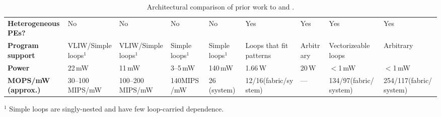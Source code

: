 {\begin{table*}[htb]
{\begin{tabular}{l|p{0.7in}p{0.7in}p{0.7in}|p{0.7in}p{0.7in}p{0.7in}|p{0.7in}p{0.7in}}
    \bf Heterogeneous PEs?  & No                                             & No                 & No                 & No                                      & Yes                                & Yes                                  & Yes               & Yes                  \\[.5ex]
    \bf Program support & VLIW/Simple loops$^1$            & VLIW/Simple loops$^1$      &  Simple loops$^1$                             & Simple loops$^1$                & Loops that fit patterns                     & Arbitrary & Vectorizeable loops & Arbitrary                    \\[.5ex]
    \midrule
    \bf Power               & 22\,mW                                         & 11\,mW             & 3--5\,mW           & 140\,mW                              & 1.66\,W                            & 20\,W                                & $<$1\,mW               & $<$1\,mW           \\[.5ex]
    \bf MOPS/mW (approx.)   & 30--100 \linebreak MIPS/mW                                        & 100--200 MIPS/mW           & 140\linebreak MIPS/mW              & 26 (system)                                 & 12/16\linebreak(fabric/system)                                & ---                                  & 134/97\linebreak (fabric/system)      & 254/117\linebreak(fabric/system)                  \\[.5ex]
    \bottomrule
  \end{tabular}

  }
	
	$^1$ Simple loops are singly-nested and have few loop-carried dependence.

  \caption{Architectural comparison of prior work to \snafu and \riptide.}
  \label{tab:motivation}
\end{table*}
}

\newcommand{\figFutureModel}{
  \begin{figure}[htb]
    \centering
    \texttt{[image: figures/pdf/future\_model\_legend-crop.pdf]} 

    \vspace{0.5em}

    \texttt{[image: figures/pdf/future\_model-crop.pdf]} 
    \caption{Device lifetime as a function of problem size. A \riptide-based system smartly discarding uninteresting data achieves similar lifetime to a hypothetical system with a 10TOPS/W processor. \riptide (Summary), which only transmits a summary of captured data, increases lifetime even more.}
    \label{fig:future:model}
  \end{figure}
}

